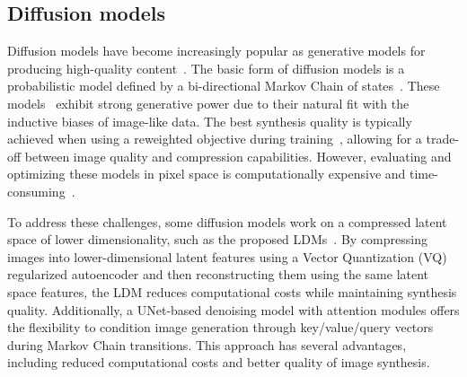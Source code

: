 \documentclass[10pt,twocolumn,letterpaper]{article}
\begin{document}
\subsection{Diffusion models}


Diffusion models have become increasingly popular as generative models for producing high-quality content~\cite{sohl2015deep}. The basic form of diffusion models is a probabilistic model defined by a bi-directional Markov Chain of states~\cite{ho2020denoising}. These models~\cite{dhariwal2021diffusion,ho2020denoising,ronneberger2015u,DBLP:conf/iclr/0011SKKEP21} exhibit strong generative power due to their natural fit with the inductive biases of image-like data. The best synthesis quality is typically achieved when using a reweighted objective during training~\cite{ho2020denoising}, allowing for a trade-off between image quality and compression capabilities. However, evaluating and optimizing these models in pixel space is computationally expensive and time-consuming~\cite{DBLP:journals/corr/abs-2106-00132,DBLP:journals/corr/abs-2104-02600,DBLP:conf/iclr/SongME21,DBLP:journals/jmlr/HoSCFNS22,DBLP:conf/nips/VahdatKK21}.


To address these challenges, some diffusion models work on a compressed latent space of lower dimensionality, such as the proposed LDMs~\cite{rombach2022high}. By compressing images into lower-dimensional latent features using a Vector Quantization (VQ)~\cite{esser2021taming} regularized autoencoder and then reconstructing them using the same latent space features, the LDM reduces computational costs while maintaining synthesis quality. Additionally, a UNet-based denoising model with attention modules offers the flexibility to condition image generation through key/value/query vectors during Markov Chain transitions. This approach has several advantages, including reduced computational costs and  better quality of image synthesis.



\end{document}
